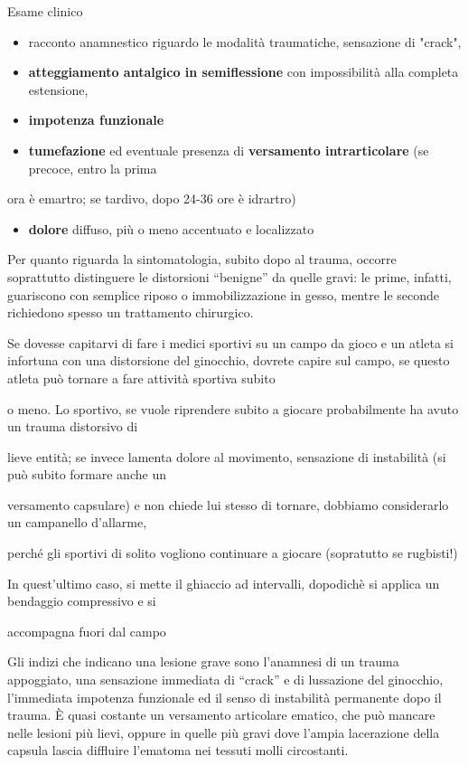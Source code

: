 \documentclass[]{article}
\begin{document}
Esame clinico

\begin{itemize}
\item
  racconto anamnestico riguardo le modalità traumatiche, sensazione di
  "crack",
\end{itemize}

\begin{itemize}
\item
  \textbf{atteggiamento antalgico in semiflessione} con impossibilità
  alla completa estensione,
\item
  \textbf{impotenza funzionale}
\item
  \textbf{tumefazione} ed eventuale presenza di \textbf{versamento
  intrarticolare} (se precoce, entro la prima
\end{itemize}

ora è emartro; se tardivo, dopo 24-36 ore è idrartro)

\begin{itemize}
\item
  \textbf{dolore} diffuso, più o meno accentuato e localizzato
\end{itemize}

Per quanto riguarda la sintomatologia, subito dopo al trauma, occorre
soprattutto distinguere le distorsioni ``benigne'' da quelle gravi: le
prime, infatti, guariscono con semplice riposo o immobilizzazione in
gesso, mentre le seconde richiedono spesso un trattamento chirurgico.

Se dovesse capitarvi di fare i medici sportivi su un campo da gioco e un
atleta si infortuna con una distorsione del ginocchio, dovrete capire
sul campo, se questo atleta può tornare a fare attività sportiva subito

o meno. Lo sportivo, se vuole riprendere subito a giocare probabilmente
ha avuto un trauma distorsivo di

lieve entità; se invece lamenta dolore al movimento, sensazione di
instabilità (si può subito formare anche un

versamento capsulare) e non chiede lui stesso di tornare, dobbiamo
considerarlo un campanello d'allarme,

perché gli sportivi di solito vogliono continuare a giocare (sopratutto
se rugbisti!)

In quest'ultimo caso, si mette il ghiaccio ad intervalli, dopodichè si
applica un bendaggio compressivo e si

accompagna fuori dal campo

Gli indizi che indicano una lesione grave sono l'anamnesi di un trauma
appoggiato, una sensazione immediata di ``crack'' e di lussazione del
ginocchio, l'immediata impotenza funzionale ed il senso di instabilità
permanente dopo il trauma. È quasi costante un versamento articolare
ematico, che può mancare nelle lesioni più lievi, oppure in quelle più
gravi dove l'ampia lacerazione della capsula lascia diffluire l'ematoma
nei tessuti molli circostanti.
\end{document}
